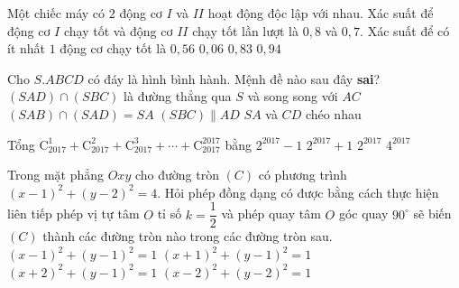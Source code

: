 \begin{ex}%
Một chiếc máy có $2$ động cơ $I$ và $II$ hoạt động độc lập với nhau. Xác suất để động cơ $I$ chạy tốt và động cơ $II$ chạy tốt lần lượt là $0{,}8$ và $0{,}7$. Xác suất để có ít nhất $1$ động cơ chạy tốt là
\choice
{$0{,}56$}
{$0{,}06$}
{$0{,}83$}
{\True $0{,}94$}
\end{ex}

\begin{ex}%
Cho $S.ABCD$ có đáy là hình bình hành. Mệnh đề nào sau đây \textbf{sai}?
\choice
{\True $(SAD)\cap (SBC)$ là đường thẳng qua $S$ và song song với $AC$}
{$(SAB)\cap (SAD)=SA$}
{$(SBC)\parallel AD$}
{$SA$ và $CD$ chéo nhau}
\end{ex}

\begin{ex}%
Tổng $\mathrm{C}_{2017}^1 +\mathrm{C}_{2017}^2 +\mathrm{C}_{2017}^3+\cdots + \mathrm{C}_{2017}^{2017}$ bằng
\choice
{\True $2^{2017}-1$}
{$2^{2017}+1$}
{$2^{2017}$}
{$4^{2017}$}
\end{ex}

\begin{ex}%
Trong mặt phẳng $Oxy$ cho đường tròn $(C)$ có phương trình $(x-1)^2+(y-2)^2=4$. Hỏi phép đồng dạng có được bằng cách thực hiện liên tiếp phép vị tự tâm $O$ tỉ số $k=\dfrac{1}{2}$ và phép quay tâm $O$ góc quay $90^\circ$ sẽ biến $(C)$ thành các đường tròn nào trong các đường tròn sau.
\choice
{$(x-1)^2+(y-1)^2=1$}
{\True $(x+1)^2+(y-1)^2=1$}
{$(x+2)^2+(y-1)^2=1$}
{$(x-2)^2+(y-2)^2=1$}
\end{ex}

